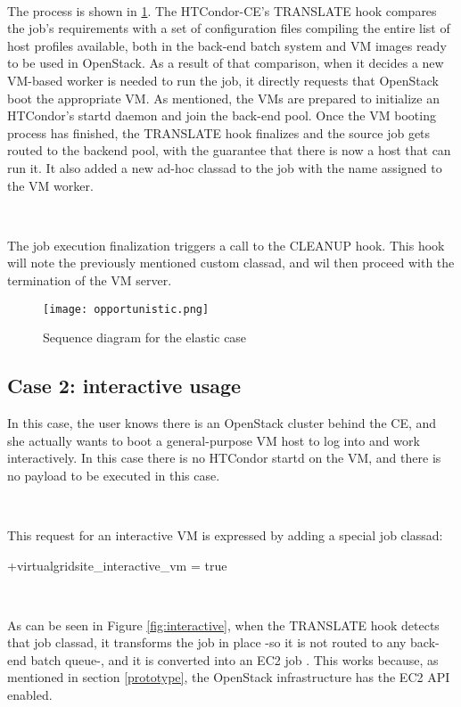 \documentclass[a4paper]{jpconf}
\begin{document}
~

The process is shown in \ref{fig:elastic}. 
The HTCondor-CE's TRANSLATE hook compares the job's requirements with a set of
configuration files compiling the entire list of host profiles available, 
both in the back-end batch system and VM images ready to be used in OpenStack.
As a result of that comparison, when it decides a new VM-based worker is needed
to run the job, it directly requests that OpenStack boot the appropriate VM.
As mentioned, the VMs are prepared to initialize an HTCondor's startd daemon and
join the back-end pool.
Once the VM booting process has finished, the TRANSLATE hook finalizes and the source job gets routed to the backend pool,
with the guarantee that there is now a host that can run it. 
It also added a new ad-hoc classad to the job with the name assigned to the VM
worker.

~

The job execution finalization triggers a call to the CLEANUP hook.
This hook will note the previously mentioned custom classad, and wil then
proceed with the termination of the VM server.


\begin{figure}[h]
    \centering
    \texttt{[image: opportunistic.png]}
    \caption{Sequence diagram for the elastic case}
    \label{fig:elastic}
\end{figure}


\subsection{Case 2: interactive usage}

In this case, the user knows there is an OpenStack cluster behind the CE, 
and she actually wants to boot a general-purpose VM host to log into and work
interactively. In this case there is no HTCondor startd on the VM, and there is no payload to be executed in this case.

~

This request for an interactive VM is expressed by adding a special job classad: 
\begin{center}
    +virtualgridsite\_interactive\_vm = true
\end{center}

~

As can be seen in Figure \ref{fig:interactive}, when the TRANSLATE hook detects that job classad, 
it transforms the job in place -so it is not routed to any back-end batch
queue-, and it is converted into an EC2 job \cite{condorec2}.
This works because, as mentioned in section \ref{prototype}, the OpenStack infrastructure has the EC2 API enabled. 
\end{document}
